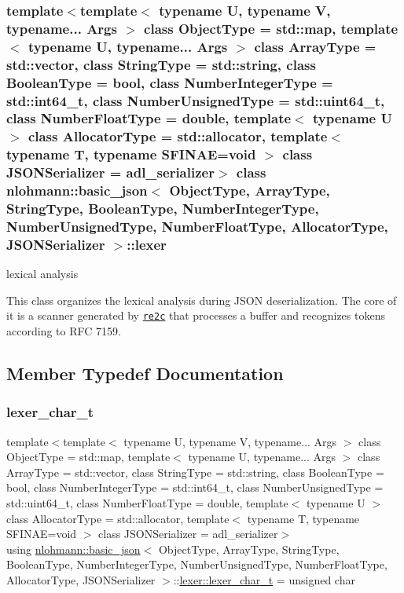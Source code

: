 \subsubsection*{template$<$template$<$ typename U, typename V, typename... Args $>$ class Object\+Type = std\+::map, template$<$ typename U, typename... Args $>$ class Array\+Type = std\+::vector, class String\+Type = std\+::string, class Boolean\+Type = bool, class Number\+Integer\+Type = std\+::int64\+\_\+t, class Number\+Unsigned\+Type = std\+::uint64\+\_\+t, class Number\+Float\+Type = double, template$<$ typename U $>$ class Allocator\+Type = std\+::allocator, template$<$ typename T, typename S\+F\+I\+N\+A\+E=void $>$ class J\+S\+O\+N\+Serializer = adl\+\_\+serializer$>$\newline
class nlohmann\+::basic\+\_\+json$<$ Object\+Type, Array\+Type, String\+Type, Boolean\+Type, Number\+Integer\+Type, Number\+Unsigned\+Type, Number\+Float\+Type, Allocator\+Type, J\+S\+O\+N\+Serializer $>$\+::lexer}

lexical analysis 

This class organizes the lexical analysis during J\+S\+ON deserialization. The core of it is a scanner generated by \href{http://re2c.org}{\tt re2c} that processes a buffer and recognizes tokens according to R\+FC 7159. 

\subsection{Member Typedef Documentation}
\mbox{\label{classnlohmann_1_1basic__json_1_1lexer_abe04be04d0575249f8806c334bacbc80}} 
\subsubsection{\texorpdfstring{lexer\+\_\+char\+\_\+t}{lexer\_char\_t}}
{\footnotesize\ttfamily template$<$template$<$ typename U, typename V, typename... Args $>$ class Object\+Type = std\+::map, template$<$ typename U, typename... Args $>$ class Array\+Type = std\+::vector, class String\+Type  = std\+::string, class Boolean\+Type  = bool, class Number\+Integer\+Type  = std\+::int64\+\_\+t, class Number\+Unsigned\+Type  = std\+::uint64\+\_\+t, class Number\+Float\+Type  = double, template$<$ typename U $>$ class Allocator\+Type = std\+::allocator, template$<$ typename T, typename S\+F\+I\+N\+A\+E=void $>$ class J\+S\+O\+N\+Serializer = adl\+\_\+serializer$>$ \\
using \hyperlink{classnlohmann_1_1basic__json}{nlohmann\+::basic\+\_\+json}$<$ Object\+Type, Array\+Type, String\+Type, Boolean\+Type, Number\+Integer\+Type, Number\+Unsigned\+Type, Number\+Float\+Type, Allocator\+Type, J\+S\+O\+N\+Serializer $>$\+::\hyperlink{classnlohmann_1_1basic__json_1_1lexer_abe04be04d0575249f8806c334bacbc80}{lexer\+::lexer\+\_\+char\+\_\+t} =  unsigned char}



